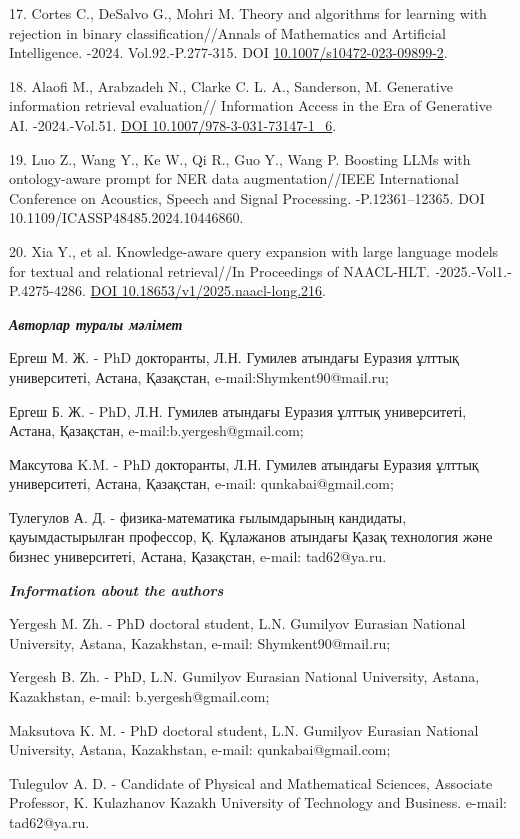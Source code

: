 \begin{refs}
17. Cortes C., DeSalvo G., Mohri M. Theory and algorithms for learning
with rejection in binary classification//Annals of Mathematics and
Artificial Intelligence. -2024. Vol.92.-P.277-315. DOI
\href{https://doi.org/10.1007/s10472-023-09899-2}{10.1007/s10472-023-09899-2}.

18. Alaofi M., Arabzadeh N., Clarke C. L. A., Sanderson, M. Generative
information retrieval evaluation// Information Access in the Era of
Generative AI. -2024.-Vol.51.
\href{https://doi.org/10.1007/978-3-031-73147-1_6}{DOI
10.1007/978-3-031-73147-1\_6}.

19. Luo Z., Wang Y., Ke W., Qi R., Guo Y., Wang P. Boosting LLMs with
ontology-aware prompt for NER data augmentation//IEEE International
Conference on Acoustics, Speech and Signal Processing. -P.12361--12365.
DOI 10.1109/ICASSP48485.2024.10446860.

20. Xia Y., et al. Knowledge-aware query expansion with large language
models for textual and relational retrieval//In Proceedings of
NAACL-HLT. \emph{-}2025.-Vol1.-P.4275-4286.
\href{https://doi.org/10.18653/v1/2025.naacl-long.216}{DOI
10.18653/v1/2025.naacl-long.216}.
\end{refs}

\begin{info}
\hspace{1em}\emph{{\bfseries Авторлар туралы мәлімет}}

Ергеш М. Ж. - PhD докторанты, Л.Н. Гумилев атындағы Еуразия ұлттық
университеті, Астана, Қазақстан,
e-mail:Shymkent90@mail.ru;

Ергеш Б. Ж. - PhD, Л.Н. Гумилев атындағы Еуразия ұлттық университеті,
Астана, Қазақстан,
e-mail:b.yergesh@gmail.com;

Максутова K.M. - PhD докторанты, Л.Н. Гумилев атындағы Еуразия ұлттық
университеті, Астана, Қазақстан, e-mail:
qunkabai@gmail.com;

Тулегулов А. Д. - физика-математика ғылымдарының кандидаты,
қауымдастырылған профессор, Қ. Құлажанов атындағы Қазақ технология және
бизнес университеті, Астана, Қазақстан, e-mail:
tad62@ya.ru.

\hspace{1em}\emph{{\bfseries Information about the authors}}

Yergesh M. Zh. - PhD doctoral student, L.N. Gumilyov Eurasian National
University, Astana, Kazakhstan, e-mail: Shymkent90@mail.ru;

Yergesh B. Zh. - PhD, L.N. Gumilyov Eurasian National University,
Astana, Kazakhstan, e-mail:
b.yergesh@gmail.com;

Maksutova K. M. - PhD doctoral student, L.N. Gumilyov Eurasian National
University, Astana, Kazakhstan, e-mail: qunkabai@gmail.com;

Tulegulov A. D. - Candidate of Physical and Mathematical Sciences,
Associate Professor, K. Kulazhanov Kazakh University of Technology and
Business. e-mail: tad62@ya.ru.
\end{info}
